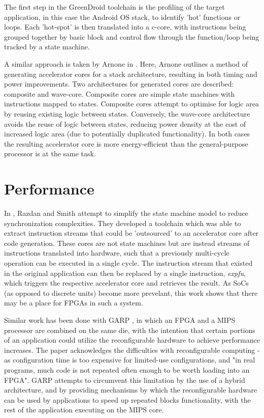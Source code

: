 \documentclass{UoYCSproject}
\begin{document}
The first step in the GreenDroid toolchain is the profiling of the target application, in this case the
Android OS stack, to identify 'hot' functions or loops. Each 'hot-spot' is then translated into a c-core,
with instructions being grouped together by basic block and control flow through the function/loop being
tracked by a state machine.

A similar approach is taken by Arnone in \cite{arnone-thesis}. Here, Arnone outlines a method of
generating accelerator cores for a stack architecture, resulting in both timing
and power improvements. Two architectures for generated cores are described: composite and wave-core.
Composite cores are simple state machines with instructions mapped to states. Composite cores attempt to
optimise for logic area by reusing existing logic between states. Conversely, the wave-core
architecture avoids the reuse of logic between states, reducing power density at the cost of increased
logic area (due to potentially duplicated functionality). In both cases the resulting accelerator core is
more energy-efficient than the general-purpose processor is at the same task.

\section{Performance}

In \cite{high-performance-microarchitecture}, Razdan and Smith attempt to simplify the state machine model
to reduce synchronization complexities. They developed a toolchain which was able to extract instruction
streams that could be 'outsourced' to an accelerator core after code generation. These cores are not state
machines but are instead streams of instructions translated into hardware, such that a previously
multi-cycle operation can be executed in a single cycle. The instruction stream that existed in the
original application can then be replaced by a single instruction, \textit{expfu}, which triggers
the respective accelerator core and retrieves the result. As SoCs (as opposed to discrete units) become
more prevelant, this work shows that there may be a place for FPGAs in such a system.

Similar work has been done with GARP \cite{garp}, in which an FPGA and a MIPS processor are combined on the
same die, with the intention that certain portions of an application could utilize the reconfigurable
hardware to achieve performance increases. The paper acknowledges the difficulties with reconfigurable
computing - as configuration time is too expensive for limited-use configurations, and "in real programs,
much code is not repeated often enough to be worth loading into an FPGA". GARP attempts to circumvent this
limitation by the use of a hybrid architecture, and by providing mechanisms by which the reconfigurable
hardware can be used by applications to speed up repeated blocks functionality, with the rest of the
application executing on the MIPS core.
\end{document}
